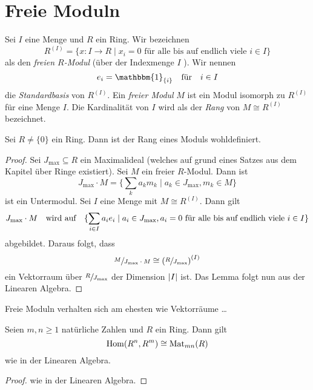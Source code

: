 \section{Freie Moduln}

\begin{definition}
	Sei $I$ eine Menge und $R$ ein Ring. Wir bezeichnen
	\[
		R^{(I)} = \{x : I \to R \mid x_{i} = 0 \text{ für alle bis auf endlich viele } i \in I\} 
	\] 
	als den \emph{freien $R$-Modul} (über der Indexmenge $I$ ). Wir nennen
	\[
		e_{i} = \mathbbm{1}_{\{i\}} \qq{für} i \in I
	\]
	die \emph{Standardbasis} von $R^{(I)}$.
	Ein \emph{freier Modul} $M$ ist ein Modul isomorph zu $R^{(I)}$ für eine Menge $I$.
	Die Kardinalität von $I$ wird als der \emph{Rang} von $M \cong R^{(I)}$ bezeichnet.
\end{definition}

\begin{lemma}
	Sei $R \neq \{0\} $ ein Ring. Dann ist der Rang eines Moduls wohldefiniert.
\end{lemma}

\begin{proof}
	Sei $J_{\max} \subseteq R$ ein Maximalideal (welches auf grund eines Satzes aus dem Kapitel über Ringe existiert).
	Sei $M$ ein freier $R$-Modul. Dann ist
	\[
	J_{\max} \cdot M = \{\sum_{k} a_{k} m_{k} \mid a_{k} \in J_{\max}, m_{k} \in M\} 
	\] 
	ist ein Untermodul. Sei $I$ eine Menge mit  $M \cong R^{(I)}$. Dann gilt  
	\[
		J_{\max} \cdot M \qq{wird auf} \{\sum_{i \in I} a_{i} e_{i} \mid a_{i} \in J_{\max}, a_{i} = 0 \text{ für alle bis auf endlich viele } i \in I\}
	\]
	abgebildet. Daraus folgt, dass
	\[
		\sfrac{M}{J_{\max} \cdot M} \cong \left( \sfrac{R}{J_{\max}} \right)^{(I)}
	\] 
	ein Vektorraum über $\sfrac{R}{J_{\max}}$ der Dimension $\abs{I}$ ist. 
	Das Lemma folgt nun aus der Linearen Algebra.
\end{proof}

\begin{claim}
	Freie Moduln verhalten sich am ehesten wie Vektorräume \ldots
\end{claim}

\begin{proposition}
	Seien $m,n \geq 1$ natürliche Zahlen und $R$ ein Ring. Dann gilt
	\[
		\operatorname{Hom}(R^{n},R^{m}) \cong \operatorname{Mat}_{mn}(R)
	\] 
	wie in der Linearen Algebra.
\end{proposition}

\begin{proof}
	wie in der Linearen Algebra.
\end{proof}

